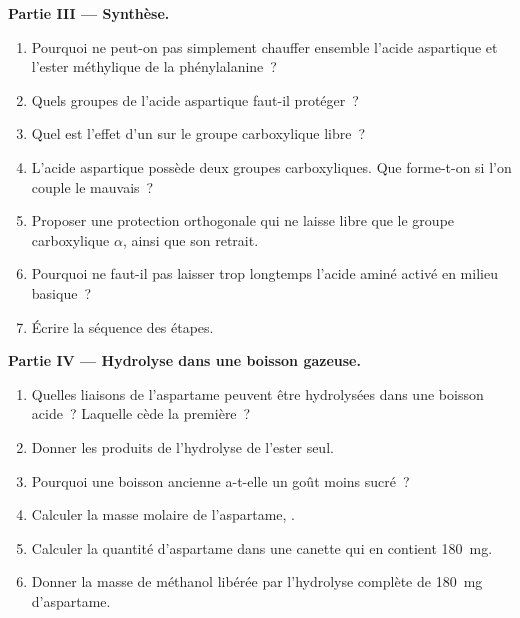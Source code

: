 \begin{problem}
\medskip
\noindent\textbf{Partie III --- Synthèse.}
\begin{enumerate}[resume]
  \item Pourquoi ne peut-on pas simplement chauffer ensemble l'acide aspartique et l'ester méthylique de la phénylalanine~?
  \item Quels groupes de l'acide aspartique faut-il protéger~?
  \item Quel est l'effet d'un  sur le groupe carboxylique libre~?
  \item L'acide aspartique possède deux groupes carboxyliques. Que forme-t-on si l'on couple le mauvais~?
  \item Proposer une protection orthogonale qui ne laisse libre que le groupe carboxylique $\alpha$, ainsi que
        son retrait.
  \item Pourquoi ne faut-il pas laisser trop longtemps l'acide aminé activé en milieu basique~?
  \item Écrire la séquence des étapes.
\end{enumerate}

\medskip
\noindent\textbf{Partie IV --- Hydrolyse dans une boisson gazeuse.}
\begin{enumerate}[resume]
  \item Quelles liaisons de l'aspartame peuvent être hydrolysées dans une boisson acide~? Laquelle cède la première~?
  \item Donner les produits de l'hydrolyse de l'ester seul.
  \item Pourquoi une boisson ancienne a-t-elle un goût moins sucré~?
  \item Calculer la masse molaire de l'aspartame, .
  \item Calculer la quantité d'aspartame dans une canette qui en contient \qty{180}{mg}.
  \item Donner la masse de méthanol libérée par l'hydrolyse complète de \qty{180}{mg}
        d'aspartame.
\end{enumerate}
\end{problem}
